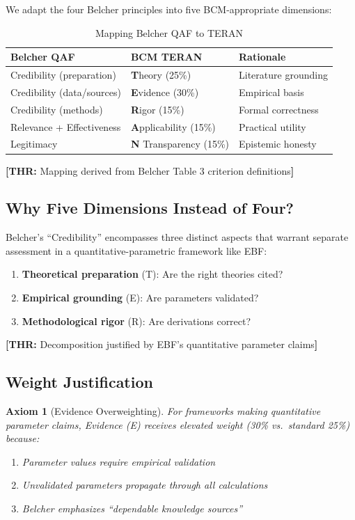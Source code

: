 \documentclass[11pt,a4paper]{article}
\newcommand{\tagTHR}[1]{\textcolor{thrblue}{\textbf{[THR:} #1\textbf{]}}}
\newtheorem{axiom}{Axiom}[section]
\begin{document}
We adapt the four Belcher principles into five BCM-appropriate dimensions:

\begin{table}[h]
\centering
\caption{Mapping Belcher QAF to TERAN}
\label{tab:mapping}
\begin{tabular}{lll}
\toprule
\textbf{Belcher QAF} & \textbf{BCM TERAN} & \textbf{Rationale} \\
\midrule
Credibility (preparation) & \textbf{T}heory (25\%) & Literature grounding \\
Credibility (data/sources) & \textbf{E}vidence (30\%) & Empirical basis \\
Credibility (methods) & \textbf{R}igor (15\%) & Formal correctness \\
Relevance + Effectiveness & \textbf{A}pplicability (15\%) & Practical utility \\
Legitimacy & \textbf{N} Transparency (15\%) & Epistemic honesty \\
\bottomrule
\end{tabular}
\end{table}

\tagTHR{Mapping derived from Belcher Table 3 criterion definitions}

\subsection{Why Five Dimensions Instead of Four?}

Belcher's ``Credibility'' encompasses three distinct aspects that warrant separate assessment in a quantitative-parametric framework like EBF:

\begin{enumerate}
    \item \textbf{Theoretical preparation} (T): Are the right theories cited?
    \item \textbf{Empirical grounding} (E): Are parameters validated?
    \item \textbf{Methodological rigor} (R): Are derivations correct?
\end{enumerate}

\tagTHR{Decomposition justified by EBF's quantitative parameter claims}

\subsection{Weight Justification}

\begin{axiom}[Evidence Overweighting]
\label{ax:evidence}
For frameworks making quantitative parameter claims, Evidence (E) receives elevated weight (30\% vs.\ standard 25\%) because:
\begin{enumerate}
    \item Parameter values require empirical validation
    \item Unvalidated parameters propagate through all calculations
    \item Belcher emphasizes ``dependable knowledge sources''
\end{enumerate}
\end{axiom}
\end{document}
